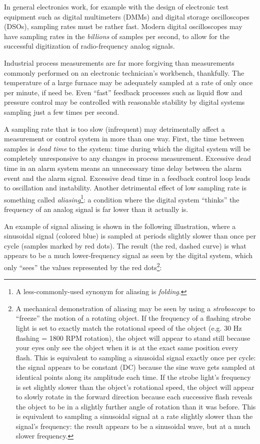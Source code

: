 In general electronics work, for example with the design of electronic test equipment such as digital multimeters (DMMs) and digital storage oscilloscopes (DSOs), sampling rates must be rather fast.  Modern digital oscilloscopes may have sampling rates in the \textit{billions} of samples per second, to allow for the successful digitization of radio-frequency analog signals.    

Industrial process measurements are far more forgiving than measurements commonly performed on an electronic technician's workbench, thankfully.  The temperature of a large furnace may be adequately sampled at a rate of only once per minute, if need be.  Even ``fast'' feedback processes such as liquid flow and pressure control may be controlled with reasonable stability by digital systems sampling just a few times per second.

A sampling rate that is too slow (infrequent) may detrimentally affect a measurement or control system in more than one way.  First, the time between samples is \textit{dead time} to the system: time during which the digital system will be completely unresponsive to any changes in process measurement.  Excessive dead time in an alarm system means an unnecessary time delay between the alarm event and the alarm signal.  Excessive dead time in a feedback control loop leads to oscillation and instability.  Another detrimental effect of low sampling rate is something called \textit{aliasing}\footnote{A less-commonly-used synonym for aliasing is \textit{folding}.}: a condition where the digital system ``thinks'' the frequency of an analog signal is far lower than it actually is.    

\filbreak

An example of signal aliasing is shown in the following illustration, where a sinusoidal signal (colored blue) is sampled at periods slightly slower than once per cycle (samples marked by red dots).  The result (the red, dashed curve) is what appears to be a much lower-frequency signal as seen by the digital system, which only ``sees'' the values represented by the red dots\footnote{A mechanical demonstration of aliasing may be seen by using a \textit{stroboscope} to ``freeze'' the motion of a rotating object.  If the frequency of a flashing strobe light is set to exactly match the rotational speed of the object (e.g. 30 Hz flashing = 1800 RPM rotation), the object will appear to stand still because your eyes only see the object when it is at the exact same position every flash.  This is equivalent to sampling a sinusoidal signal exactly once per cycle: the signal appears to be constant (DC) because the sine wave gets sampled at identical points along its amplitude each time.  If the strobe light's frequency is set slightly slower than the object's rotational speed, the object will appear to slowly rotate in the forward direction because each successive flash reveals the object to be in a slightly further angle of rotation than it was before.  This is equivalent to sampling a sinusoidal signal at a rate slightly slower than the signal's frequency: the result appears to be a sinusoidal wave, but at a much slower frequency.}:    

